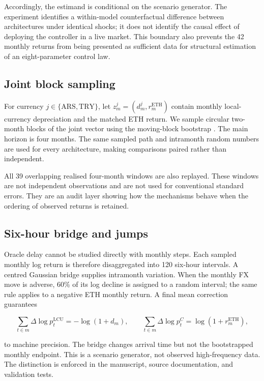 \documentclass[sn-vancouver,Numbered]{sn-jnl}
\newcommand{\lcu}{\mathrm{LCU}}
\begin{document}
Accordingly, the estimand is conditional on the scenario generator. The experiment identifies a within-model counterfactual difference between architectures under identical shocks; it does not identify the causal effect of deploying the controller in a live market. This boundary also prevents the 42 monthly returns from being presented as sufficient data for structural estimation of an eight-parameter control law.

\subsection{Joint block sampling}

For currency $j\in\{\mathrm{ARS},\mathrm{TRY}\}$, let $z_m^j=(d_m^j,r_m^{\mathrm{ETH}})$ contain monthly local-currency depreciation and the matched ETH return. We sample circular two-month blocks of the joint vector using the moving-block bootstrap \cite{Kunsch1989}. The main horizon is four months. The same sampled path and intramonth random numbers are used for every architecture, making comparisons paired rather than independent.

All 39 overlapping realised four-month windows are also replayed. These windows are not independent observations and are not used for conventional standard errors. They are an audit layer showing how the mechanisms behave when the ordering of observed returns is retained.

\subsection{Six-hour bridge and jumps}

Oracle delay cannot be studied directly with monthly steps. Each sampled monthly log return is therefore disaggregated into 120 six-hour intervals. A centred Gaussian bridge supplies intramonth variation. When the monthly FX move is adverse, 60\% of its log decline is assigned to a random interval; the same rule applies to a negative ETH monthly return. A final mean correction guarantees

\begin{equation}
 \sum_{t\in m}\Delta\log p_t^{\lcu}=-\log(1+d_m),
 \qquad
 \sum_{t\in m}\Delta\log p_t^{C}=\log(1+r_m^{\mathrm{ETH}}),
 \label{eq:bridge}
\end{equation}

to machine precision. The bridge changes arrival time but not the bootstrapped monthly endpoint. This is a scenario generator, not observed high-frequency data. The distinction is enforced in the manuscript, source documentation, and validation tests.
\end{document}
